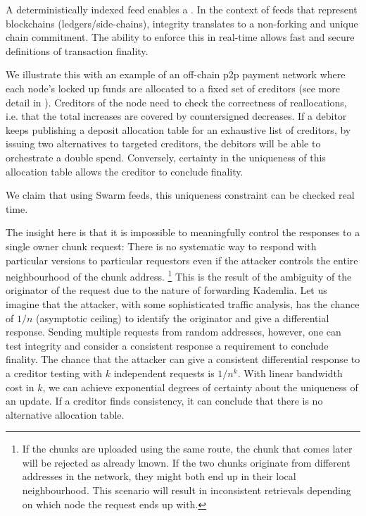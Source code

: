 A deterministically indexed feed enables a . In the context of feeds that represent blockchains (ledgers/side-chains), integrity translates to a non-forking and unique chain commitment. The ability to enforce this in real-time allows fast and secure definitions of transaction finality. 

We illustrate this with an example of an off-chain p2p payment network where each node's locked up funds are allocated to a fixed set of creditors (see more detail in \cite{ethersphere2019swap}). Creditors of the node need to check the correctness of reallocations, i.e. that the total increases are  covered by countersigned decreases. 
If a debitor keeps publishing a deposit allocation table for an exhaustive list of creditors, by issuing two alternatives to targeted creditors, the debitors will be able to orchestrate a double spend. Conversely, certainty in the uniqueness of this allocation table allows the creditor to conclude finality.

We claim that using Swarm feeds, this uniqueness constraint can be checked real time.

The insight here is that it is impossible to meaningfully control the responses to a single owner chunk request: There is no systematic way to respond with particular versions to particular requestors even if the attacker controls the entire neighbourhood of the chunk address.%
%
\footnote{If the chunks are uploaded using the same route, the chunk that comes later will be rejected as already known. If the two chunks originate from different addresses in the network, they might both end up in their local neighbourhood. This scenario will result in inconsistent retrievals depending on which node the request ends up with.}
%
This is the result of the ambiguity of the originator of the request due to the nature of forwarding Kademlia. Let us imagine that the attacker, with some sophisticated traffic analysis, has the chance of $1/n$ (asymptotic ceiling) to identify the originator and give a differential response. Sending multiple requests from random addresses, however, one can test integrity and consider a consistent response a requirement to conclude finality. The chance that the attacker can give a consistent differential response to a creditor testing with $k$ independent requests is $1/n^k$. With linear bandwidth cost in $k$, we can achieve exponential degrees of certainty about the uniqueness of an update. If a creditor finds consistency, it can conclude that there is no alternative allocation table.


